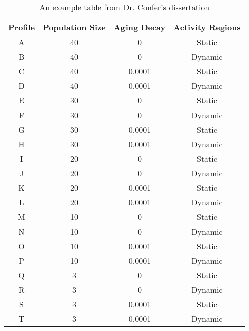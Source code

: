 \begin{table}
\begin{center}
\begin{tabular}{|c||c|c|c|}
\hline
Profile	&	Population Size	&	Aging Decay	&	Activity Regions	\\
\hline \hline 
A	&	40	&	0	&	Static	\\
B	&	40	&	0	&	Dynamic	\\
C	&	40	&	0.0001	&	Static	\\
D	&	40	&	0.0001	&	Dynamic	\\
\hline
E	&	30	&	0	&	Static	\\
F	&	30	&	0	&	Dynamic	\\
G	&	30	&	0.0001	&	Static	\\
H	&	30	&	0.0001	&	Dynamic	\\
\hline
I	&	20	&	0	&	Static	\\
J	&	20	&	0	&	Dynamic	\\
K	&	20	&	0.0001	&	Static	\\
L	&	20	&	0.0001	&	Dynamic	\\
\hline
M	&	10	&	0	&	Static	\\
N	&	10	&	0	&	Dynamic	\\
O	&	10	&	0.0001	&	Static	\\
P	&	10	&	0.0001	&	Dynamic	\\
\hline
Q	&	3	&	0	&	Static	\\
R	&	3	&	0	&	Dynamic	\\
S	&	3	&	0.0001	&	Static	\\
T	&	3	&	0.0001	&	Dynamic	\\
\hline
\end{tabular}
\caption{An example table from Dr. Confer's dissertation \cite{confer_2005_activity}}
\label{tbl_example}
\end{center}
\end{table}